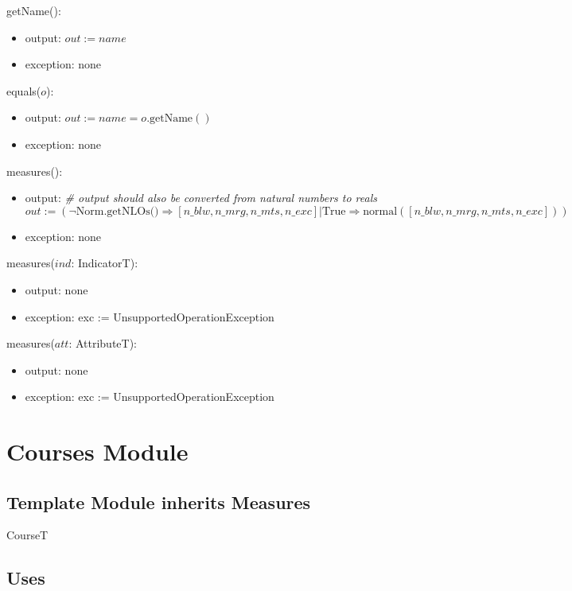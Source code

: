 \documentclass[12pt]{article}
\begin{document}
\noindent getName():
\begin{itemize}
\item output: $out := \mathit{name}$
\item exception: none
\end{itemize}

\noindent equals($o$):
\begin{itemize}
\item output: $out := \mathit{name} = o.\text{getName}()$
\item exception: none
\end{itemize}

\noindent measures($\mathit{}$):
\begin{itemize} 
\item output: \textit{\# output should also be converted from natural numbers to reals}
  $$out := (\neg \text{Norm.getNLOs()} \Rightarrow [\mathit{n\_blw}, \mathit{n\_mrg}, \mathit{n\_mts},
  \mathit{n\_exc}] | \text{True} \Rightarrow \text{normal}([\mathit{n\_blw},
  \mathit{n\_mrg}, \mathit{n\_mts}, \mathit{n\_exc}]))$$
  
\item exception: none
\end{itemize}

\noindent measures($\mathit{ind}$: IndicatorT):
\begin{itemize}
\item output: none
\item exception: exc := UnsupportedOperationException
\end{itemize}

\noindent measures($\mathit{att}$: AttributeT):
\begin{itemize}
\item output: none
\item exception: exc := UnsupportedOperationException
\end{itemize}

\newpage

\section* {Courses Module}

\subsection*{Template Module inherits Measures}

CourseT

\subsection* {Uses}
\end{document}
